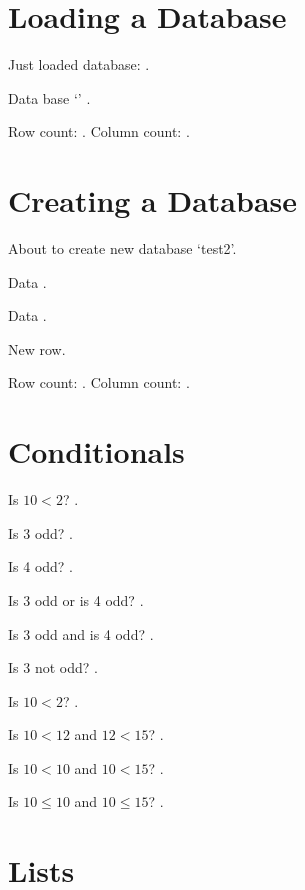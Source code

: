 \documentclass{article}
\begin{document}
\section{Loading a Database}

Just loaded database: \mydata.

Data base `\mydata' .

Row count: \DTLrowcount{\mydata}.
Column count: \DTLcolumncount{\mydata}.

\section{Creating a Database}
About to create new database `test2'.

Data
.

Data
.

New row.

Row count: .
Column count: .

\section{Conditionals}

Is $10 < 2$? .

Is 3 odd? .

Is 4 odd? .

Is 3 odd or is 4 odd? .

Is 3 odd and is 4 odd? .

Is 3 not odd? .

Is $10 < 2$? .

Is $10 < 12$ and $12 < 15$? .

Is $10 < 10$ and $10 < 15$? .

Is $10 \leq 10$ and $10 \leq 15$? .

\section{Lists}
\end{document}
